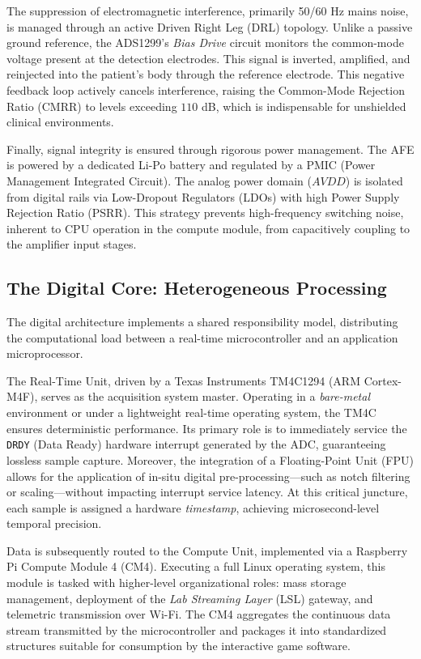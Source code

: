 The suppression of electromagnetic interference, primarily 50/60 Hz mains noise, is managed through an active Driven Right Leg (DRL) topology. Unlike a passive ground reference, the ADS1299's \textit{Bias Drive} circuit monitors the common-mode voltage present at the detection electrodes. This signal is inverted, amplified, and reinjected into the patient's body through the reference electrode. This negative feedback loop actively cancels interference, raising the Common-Mode Rejection Ratio (CMRR) to levels exceeding $110$ dB, which is indispensable for unshielded clinical environments.

Finally, signal integrity is ensured through rigorous power management. The AFE is powered by a dedicated Li-Po battery and regulated by a PMIC (Power Management Integrated Circuit). The analog power domain ($AVDD$) is isolated from digital rails via Low-Dropout Regulators (LDOs) with high Power Supply Rejection Ratio (PSRR). This strategy prevents high-frequency switching noise, inherent to CPU operation in the compute module, from capacitively coupling to the amplifier input stages.

\subsection{The Digital Core: Heterogeneous Processing}
\label{subsec:digital_core}

The digital architecture implements a shared responsibility model, distributing the computational load between a real-time microcontroller and an application microprocessor.

The Real-Time Unit, driven by a Texas Instruments TM4C1294 (ARM Cortex-M4F), serves as the acquisition system master. Operating in a \textit{bare-metal} environment or under a lightweight real-time operating system, the TM4C ensures deterministic performance. Its primary role is to immediately service the \texttt{DRDY} (Data Ready) hardware interrupt generated by the ADC, guaranteeing lossless sample capture. Moreover, the integration of a Floating-Point Unit (FPU) allows for the application of in-situ digital pre-processing—such as notch filtering or scaling—without impacting interrupt service latency. At this critical juncture, each sample is assigned a hardware \textit{timestamp}, achieving microsecond-level temporal precision.

Data is subsequently routed to the Compute Unit, implemented via a Raspberry Pi Compute Module 4 (CM4). Executing a full Linux operating system, this module is tasked with higher-level organizational roles: mass storage management, deployment of the \textit{Lab Streaming Layer} (LSL) gateway, and telemetric transmission over Wi-Fi. The CM4 aggregates the continuous data stream transmitted by the microcontroller and packages it into standardized structures suitable for consumption by the interactive game software.

